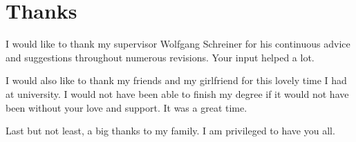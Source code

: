 \newpage

\section*{Thanks}

I would like to thank my supervisor Wolfgang Schreiner for his continuous advice and suggestions throughout numerous revisions. Your input helped a lot.

I would also like to thank my friends and my girlfriend for this lovely time I had at university. I would not have been able to finish my degree if it would not have been without your love and support. It was a great time.

Last but not least, a big thanks to my family. I am privileged to have you all.

\newpage